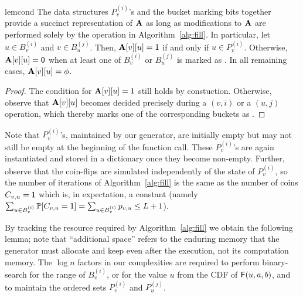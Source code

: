 \begin{restatable}{lem}{cond}\label{lem:cond-0-fill}
The data structures $P_v^{(i)}$'s and the bucket marking bits together provide a succinct representation of $\mathbf{A}$ as long as modifications to $\mathbf{A}$ are performed solely by the  operation in Algorithm~\ref{alg:fill}. In particular, let $u \in B_v^{(i)}$ and $v \in B_u^{(j)}$. Then, $\mathbf{A}[v][u]=\mathsf{1}$ if and only if $u \in P_v^{(i)}$. Otherwise, $\mathbf{A}[v][u]=\mathsf{0}$ when at least one of $B_v^{(i)}$ or $B_u^{(j)}$ is marked as \filled. In all remaining cases, $\mathbf{A}[v][u]=\phi$.
\end{restatable}
\begin{proof}
The condition for $\mathbf{A}[v][u]=\mathsf{1}$ still holds by constuction. Otherwise, observe that $\mathbf{A}[v][u]$ becomes decided precisely during a $(v,i)$ or a $(u,j)$ operation, which thereby marks one of the corresponding buckets as \filled.
\end{proof}


Note that $P_v^{(i)}$'s, maintained by our generator, are initially empty but may not still be empty at the beginning of the  function call. These $P_v^{(i)}$'s are again instantiated and stored in a dictionary once they become non-empty.
Further, observe that the coin-flips are simulated independently of the state of $P_v^{(i)}$, so the number of iterations of Algorithm~\ref{alg:fill} is the same as the number of coins $C_{v,u} = \mathsf{1}$ which is, in expectation, a constant (namely $\sum_{u\in B_v^{(i)}} \mathbb P[C_{v,u}=\mathsf{1}] = \sum_{u\in B_v^{(i)}} p_{v,u} \leq L+1$). %



By tracking the resource required by Algorithm~\ref{alg:fill} we obtain the following lemma; note that ``additional space'' refers to the enduring memory that the generator must allocate and keep even after the execution, not its computation memory. The $\log n$ factors in our complexities are required to perform binary-search for the range of $B_v^{(i)}$, or for the value $u$ from the CDF of $\mathsf{F}(u,a,b)$, and to maintain the ordered sets $P_v^{(i)}$ and $P_u^{(j)}$.


